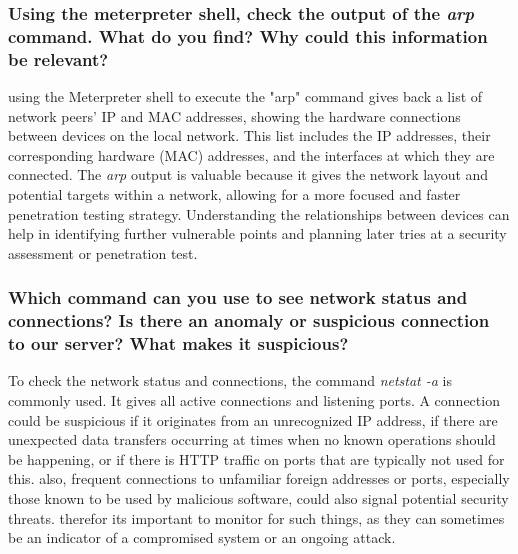 \subsubsection{Using the meterpreter shell, check the output of the \textit{arp} command. What do you find? Why could this information be relevant?}
using the Meterpreter shell to execute the "arp" command gives back a list of network peers' IP and MAC addresses, showing the hardware connections between devices on the local network.
This list includes the IP addresses, their corresponding hardware (MAC) addresses, and the interfaces at which they are connected.
The \textit{arp} output is valuable because it gives the network layout and potential targets within a network,
allowing for a more focused and faster penetration testing strategy. Understanding the relationships between devices can help in identifying further vulnerable points
and planning later tries at a security assessment or penetration test.

\subsubsection{Which command can you use to see network status and connections? Is there an anomaly or suspicious connection to our server? What makes it suspicious?}
To check the network status and connections, the command \textit{netstat -a} is commonly used.
It gives all active connections and listening ports. A connection could be suspicious if it originates from an unrecognized IP address,
if there are unexpected data transfers occurring at times when no known operations should be happening, or if there is HTTP traffic on ports that are typically not used for this.
also, frequent connections to unfamiliar foreign addresses or ports, especially those known to be used by malicious software, could also signal potential security threats.
therefor its important to monitor for such things, as they can sometimes be an indicator of a compromised system or an ongoing attack.